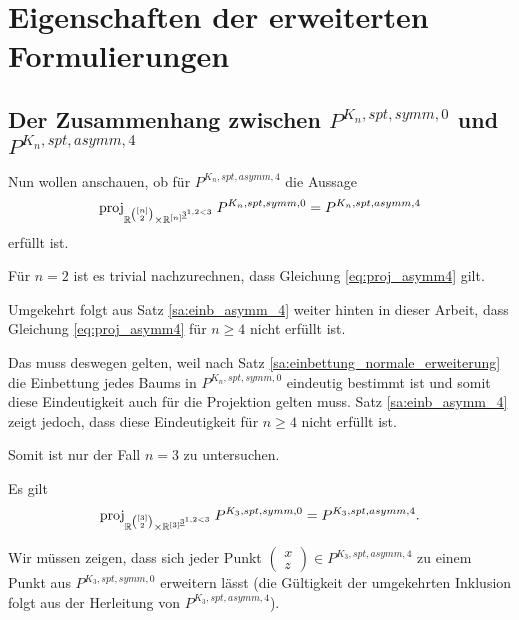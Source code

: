 \documentclass[10p,a4paper,BCOR = 12mm, DIV=15]{scrbook}
\begin{document}
{\part{Eigenschaften der erweiterten Formulierungen}

\chapter{Der Zusammenhang zwischen $P^{K_n, spt, symm, 0}$ und $P^{K_n, spt, asymm, 4}$}

Nun wollen anschauen, ob für $P^{K_n, spt, asymm, 4}$ die Aussage
\begin{equation}
\operatorname{proj}_{\mathbb{R}^{\left[n\right] \choose 2} \times \mathbb{R}^{\left[n\right]^{\underline{3}^{1,2<3}}}} P^{K_n, spt, symm, 0} = P^{K_n, spt, asymm, 4} \label{eq:proj_asymm4}
\end{equation}
erfüllt ist.

Für $n=2$ ist es trivial nachzurechnen, dass Gleichung \eqref{eq:proj_asymm4} gilt.

Umgekehrt folgt aus Satz \ref{sa:einb_asymm_4} weiter hinten in dieser Arbeit, dass Gleichung \eqref{eq:proj_asymm4} für $n \geq 4$ nicht erfüllt ist.

Das muss deswegen gelten, weil nach Satz \ref{sa:einbettung_normale_erweiterung} die Einbettung jedes Baums in $P^{K_n, spt, symm, 0}$ eindeutig bestimmt ist und somit diese Eindeutigkeit auch für die Projektion gelten muss. Satz \ref{sa:einb_asymm_4} zeigt jedoch, dass diese Eindeutigkeit für $n \geq 4$ nicht erfüllt ist.

Somit ist nur der Fall $n = 3$ zu untersuchen.

\begin{Le}
\label{le:proj_Pasymm4_n3}
Es gilt
\begin{displaymath}
\operatorname{proj}_{\mathbb{R}^{\left[3\right] \choose 2} \times \mathbb{R}^{\left[3\right]^{\underline{3}^{1,2<3}}}} P^{K_3, spt, symm, 0} = P^{K_3, spt, asymm, 4}.
\end{displaymath}
\end{Le}
\begin{bew}
Wir müssen zeigen, dass sich jeder Punkt $\left(\begin{array}{c}
x \\
z
\end{array}\right) \in P^{K_3, spt, asymm, 4}$ zu einem Punkt aus $P^{K_3, spt, symm, 0}$ erweitern lässt (die Gültigkeit der umgekehrten Inklusion folgt aus der Herleitung von $P^{K_3, spt, asymm, 4}$).


\end{bew}}
\end{document}
